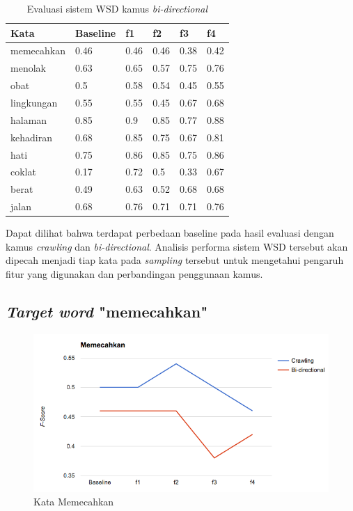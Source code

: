 \begin{table}
	\centering
	\caption{Evaluasi sistem WSD kamus \textit{bi-directional}}
	\label{table:wsd-evaluation-bidirectional}
	\begin{tabular}{|p{3cm}|p{1.5cm}|p{1.5cm}|p{1.5cm}|p{1.5cm}|p{1.5cm}|}
		\hline
		Kata & Baseline & f1 & f2 & f3 & f4 \\ \hline
		memecahkan & 0.46 & 0.46 & 0.46 & 0.38 & 0.42 \\ \hline
		menolak & 0.63 & 0.65 & 0.57 & 0.75 & 0.76 \\ \hline
		obat & 0.5 & 0.58 & 0.54 & 0.45 & 0.55 \\ \hline
		lingkungan & 0.55 & 0.55 & 0.45 & 0.67 & 0.68 \\ \hline
		halaman & 0.85 & 0.9 & 0.85 & 0.77 & 0.88 \\ \hline
		kehadiran & 0.68 & 0.85 & 0.75 & 0.67 & 0.81 \\ \hline
		hati & 0.75 & 0.86 & 0.85 & 0.75 & 0.86 \\ \hline
		coklat & 0.17 & 0.72 & 0.5 & 0.33 & 0.67 \\ \hline
		berat & 0.49 & 0.63 & 0.52 & 0.68 & 0.68 \\ \hline
		jalan & 0.68 & 0.76 & 0.71 & 0.71 & 0.76 \\ \hline
	\end{tabular} 
\end{table}

Dapat dilihat bahwa terdapat perbedaan baseline pada hasil evaluasi dengan kamus \textit{crawling} dan \textit{bi-directional}. Analisis performa sistem WSD tersebut akan dipecah menjadi tiap kata pada \textit{sampling} tersebut untuk mengetahui pengaruh fitur yang digunakan dan perbandingan penggunaan kamus.

\subsection{\textit{Target word} "memecahkan"}

\begin{figure}
	\centering
	\includegraphics[width=1\linewidth]{adit_pics/memecahkan.png}
	\caption{Kata Memecahkan}
	\label{fig:memecahkan}
\end{figure}

